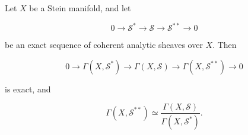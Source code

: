 Let $X$ be a Stein manifold, and let

$$0 \to \mathcal{S}^* \to \mathcal{S} \to \mathcal{S}^{**} \to 0$$

be an exact sequence of coherent analytic sheaves over $X$. Then

$$0 \to \Gamma(X, \mathcal{S}^*) \to \Gamma(X, \mathcal{S}) \to \Gamma(X, \mathcal{S}^{**}) \to 0$$

is exact, and

$$\Gamma(X, \mathcal{S}^{**}) \simeq \frac{\Gamma(X, \mathcal{S})}{\Gamma(X, \mathcal{S}^{*})}.$$
